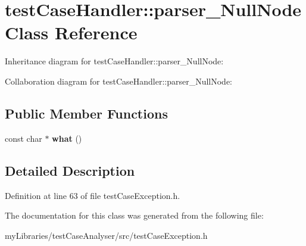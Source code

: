 \hypertarget{classtestCaseHandler_1_1parser__NullNode}{}\section{test\+Case\+Handler\+::parser\+\_\+\+Null\+Node Class Reference}
\label{classtestCaseHandler_1_1parser__NullNode}


Inheritance diagram for test\+Case\+Handler\+::parser\+\_\+\+Null\+Node\+:


Collaboration diagram for test\+Case\+Handler\+::parser\+\_\+\+Null\+Node\+:
\subsection*{Public Member Functions}
\begin{DoxyCompactItemize}
\item 
\mbox{\label{classtestCaseHandler_1_1parser__NullNode_a149da6dbd26b6ce7f83acb23f5fa91f3}} 
const char $\ast$ {\bfseries what} ()
\end{DoxyCompactItemize}


\subsection{Detailed Description}


Definition at line 63 of file test\+Case\+Exception.\+h.



The documentation for this class was generated from the following file\+:\begin{DoxyCompactItemize}
\item 
my\+Libraries/test\+Case\+Analyser/src/test\+Case\+Exception.\+h\end{DoxyCompactItemize}
